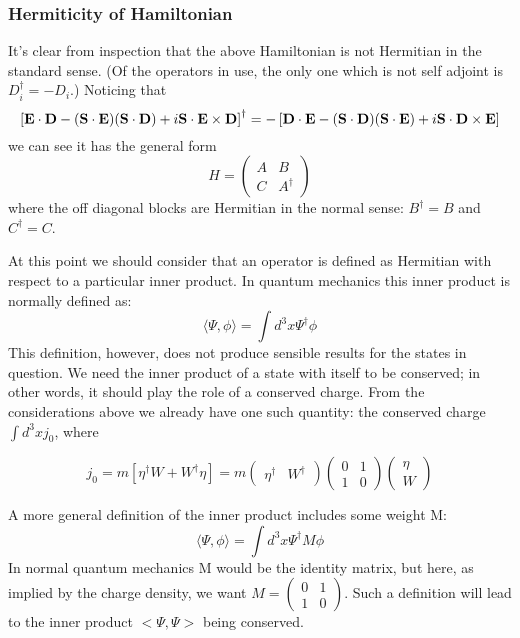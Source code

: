 \subsubsection{Hermiticity of Hamiltonian}


It's clear from inspection that the above Hamiltonian is not Hermitian in the standard sense.  (Of the operators in use, the only one which is not self adjoint is $D_i^\dagger = - D_i$.)  Noticing that 
\[
	\left [ \mathbf{E} \cdot \mathbf{D} - (\mathbf{S} \cdot \mathbf{E})( \mathbf{S} \cdot \mathbf{D}) + i \mathbf{S} \cdot \mathbf{E} \times \mathbf{D} \right]^\dagger 
		= - \left [ \mathbf{D} \cdot \mathbf{E} - (\mathbf{S} \cdot \mathbf{D}) (\mathbf{S} \cdot \mathbf{E}) + i \mathbf{S} \cdot \mathbf{D} \times \mathbf{E} \right ] 
\]
we can see it has the general form 
\[
	H = 
\begin{pmatrix}
	A	&	B	\\
	C	&	A^\dagger
\end{pmatrix}
\]
where the off diagonal blocks are Hermitian in the normal sense: $B^\dagger = B$ and $C^\dagger=C$.

At this point we should consider that an operator is defined as Hermitian with respect to a particular inner product.  In quantum mechanics this inner product is normally defined as:
\[	\langle \Psi, \phi \rangle = \int d^3x \Psi^\dagger \phi	\]
This definition, however, does not produce sensible results for the states in question.  We need the inner product of a state with itself to be conserved; in other words, it should play the role of a conserved charge.  From the considerations above we already have one such quantity: the conserved charge $\int d^3x j_0$, where 

\[	
	j_0 = m [\eta^\dagger W + W^\dagger \eta] 
		= 	m \begin{pmatrix} \eta^\dagger & W^\dagger \end{pmatrix}
			\begin{pmatrix} 0 & 1 \\ 1 & 0 \end{pmatrix}
			\begin{pmatrix} \eta \\ W \end{pmatrix}
\]

A more general definition of the inner product includes some weight M: 
\[	\langle \Psi, \phi \rangle = \int d^3x \Psi^\dagger M \phi	\]
In normal quantum mechanics M would be the identity matrix, but here, as implied by the charge density, we want $M=\begin{pmatrix} 0 & 1 \\ 1 & 0 \end{pmatrix}$.  Such a definition will lead to the inner product $<\Psi, \Psi>$ being conserved.

